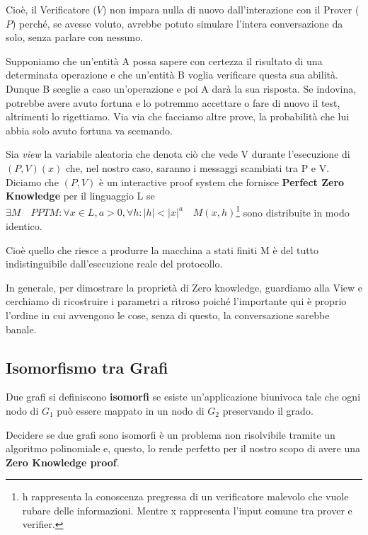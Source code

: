 Cioè, il Verificatore ($V$) non impara nulla di nuovo dall'interazione con il Prover ($P$) perché, se avesse voluto, avrebbe potuto simulare l'intera conversazione da solo, senza parlare con nessuno.

Supponiamo che un'entità A possa sapere con certezza il risultato di una determinata operazione e che un'entità B voglia verificare questa sua abilità. Dunque B sceglie a caso un'operazione e poi A darà la sua risposta. Se indovina, potrebbe avere avuto fortuna e lo potremmo accettare o fare di nuovo il test, altrimenti lo rigettiamo. Via via che facciamo altre prove, la probabilità che lui abbia solo avuto fortuna va scemando. 

Sia \textit{view} la variabile aleatoria che denota ciò che vede V durante l'esecuzione di $(P,V)(x)$ che, nel nostro caso, saranno i messaggi scambiati tra P e V. Diciamo che $(P,V)$ è un interactive proof system che fornisce \textbf{Perfect Zero Knowledge} per il linguaggio L se $\exists M \quad PPTM:\forall x \in L, a > 0, \forall h: |h| < |x|^a \quad M(x,h)$\footnote{h rappresenta la conoscenza pregressa di un verificatore malevolo che vuole rubare delle informazioni. Mentre x rappresenta l'input comune tra prover e verifier.} sono distribuite in modo identico. 

Cioè quello che riesce a produrre la macchina a stati finiti M è del tutto indistinguibile dall'esecuzione reale del protocollo.    

In generale, per dimostrare la proprietà di Zero knowledge, guardiamo alla View e cerchiamo di ricostruire i parametri a ritroso poiché l'importante qui è proprio l'ordine in cui avvengono le cose, senza di questo, la conversazione sarebbe banale.

\subsection{Isomorfismo tra Grafi}
Due grafi si definiscono \textbf{isomorfi} se esiste un'applicazione biunivoca tale che ogni nodo di $G_1$ può essere mappato in un nodo di $G_2$ preservando il grado.  

Decidere se due grafi sono isomorfi è un problema non risolvibile tramite un algoritmo polinomiale e, questo, lo rende perfetto per il nostro scopo di avere una \textbf{Zero Knowledge proof}.


